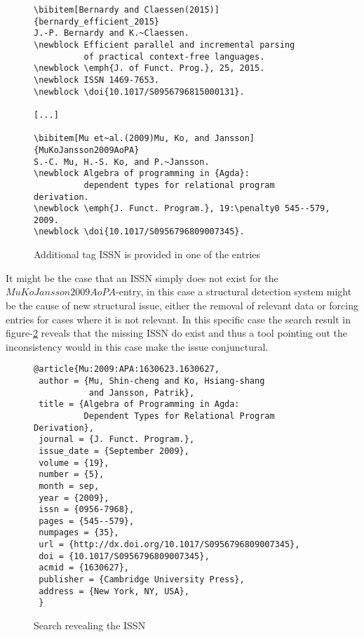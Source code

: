 \begin{figure}[ht]
  \centering
  \begin{small}
\begin{verbatim}
\bibitem[Bernardy and Claessen(2015)]{bernardy_efficient_2015}
J.-P. Bernardy and K.~Claessen.
\newblock Efficient parallel and incremental parsing
          of practical context-free languages.
\newblock \emph{J. of Funct. Prog.}, 25, 2015.
\newblock ISSN 1469-7653.
\newblock \doi{10.1017/S0956796815000131}.

[...]

\bibitem[Mu et~al.(2009)Mu, Ko, and Jansson]{MuKoJansson2009AoPA}
S.-C. Mu, H.-S. Ko, and P.~Jansson.
\newblock Algebra of programming in {Agda}:
          dependent types for relational program derivation.
\newblock \emph{J. Funct. Program.}, 19:\penalty0 545--579, 2009.
\newblock \doi{10.1017/S0956796809007345}.
\end{verbatim}
  \end{small}
  \caption{Additional tag ISSN is provided in one of the entries}
\label{fig:entry_with_issn}
\end{figure}

It might be the case that an ISSN simply does not exist for the
$MuKoJansson2009AoPA$-entry, in this case a structural detection
system might be the cause of new structural issue, either the removal
of relevant data or forcing entries for cases where it is not
relevant.  In this specific case the search result in
figure-\ref{fig:entry_issn_found} reveals that the missing ISSN do
exist and thus a tool pointing out the inconsistency would in this
case make the issue conjunctural.

\begin{figure}[ht]
  \centering
\begin{verbatim}
@article{Mu:2009:APA:1630623.1630627,
 author = {Mu, Shin-cheng and Ko, Hsiang-shang 
           and Jansson, Patrik},
 title = {Algebra of Programming in Agda: 
          Dependent Types for Relational Program Derivation},
 journal = {J. Funct. Program.},
 issue_date = {September 2009},
 volume = {19},
 number = {5},
 month = sep,
 year = {2009},
 issn = {0956-7968},
 pages = {545--579},
 numpages = {35},
 url = {http://dx.doi.org/10.1017/S0956796809007345},
 doi = {10.1017/S0956796809007345},
 acmid = {1630627},
 publisher = {Cambridge University Press},
 address = {New York, NY, USA},
 }
\end{verbatim}
  \caption{Search revealing the ISSN}
\label{fig:entry_issn_found}
\end{figure}

